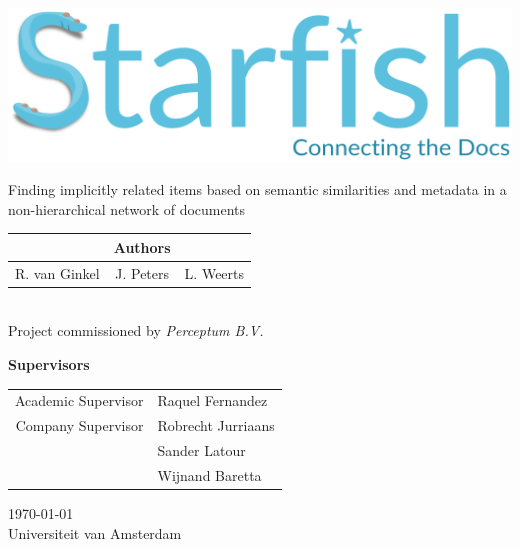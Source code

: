 \documentclass[a4paper]{article}
\begin{document}
\thispagestyle{empty}
\begin{center}
\includegraphics[width=\linewidth]{logo_starfish_project}\\\vspace{1cm}

{\large
Finding implicitly related items based on semantic similarities and metadata in a non-hierarchical network of documents
}\\\vspace{0.5cm}

\begin{tabular*}{0.8\linewidth}{@{\extracolsep{\fill}}lcr}
& \textbf{Authors} & \\
\hline
R. van Ginkel 	& J. Peters 	& L. Weerts \\
\end{tabular*}
\\\vspace{2cm}
Project commissioned by \emph{Perceptum B.V.}\\\vspace{1cm}

\textbf{Supervisors}\\
\begin{tabular}{r|l}
Academic Supervisor & Raquel Fernandez \\
Company Supervisor & Robrecht Jurriaans \\
& Sander Latour \\
& Wijnand Baretta
\end{tabular}


\vfill
\today\\
Universiteit van Amsterdam

\end{center}
\restoregeometry

\clearpage

\begin{abstract}

\end{abstract}

\tableofcontents
\clearpage











\end{document}

